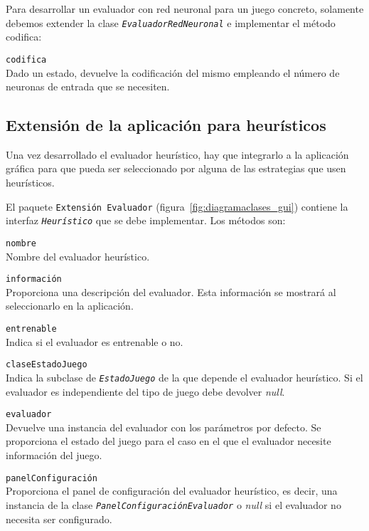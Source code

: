 \bigskip
Para desarrollar un evaluador con red neuronal para un juego concreto, solamente debemos extender la clase \texttt{\textit{EvaluadorRedNeuronal}} e implementar el método codifica:
\begin{description}
	\item \texttt{codifica} \\
	Dado un estado, devuelve la codificación del mismo empleando el número de neuronas de entrada que se necesiten.
\end{description}

\subsection{Extensión de la aplicación para heurísticos}
\label{ssec:extension_aplicacion_heuristicos}
Una vez desarrollado el evaluador heurístico, hay que integrarlo a la aplicación gráfica para que pueda ser seleccionado por alguna de las estrategias que usen heurísticos.

El paquete \texttt{Extensión Evaluador} (figura~\ref{fig:diagramaclases_gui}) contiene la interfaz \texttt{\textit{Heurístico}} que se debe implementar.
Los métodos son:
\begin{description}
\item \texttt{nombre} \\
	Nombre del evaluador heurístico.
	\item \texttt{información} \\
	Proporciona una descripción del evaluador. Esta información se mostrará al seleccionarlo en la aplicación.
	\item \texttt{entrenable} \\
	Indica si el evaluador es entrenable o no.
	\item \texttt{claseEstadoJuego} \\
	Indica la subclase de \texttt{\textit{EstadoJuego}} de la que depende el evaluador heurístico. Si el evaluador es independiente del tipo de juego debe devolver \textit{null}.	
	\item \texttt{evaluador} \\
	Devuelve una instancia del evaluador con los parámetros por defecto. Se proporciona el estado del juego para el caso en el que el evaluador necesite información del juego.
	\item \texttt{panelConfiguración} \\
	Proporciona el panel de configuración del evaluador heurístico, es decir, una instancia de la clase \texttt{\textit{PanelConfiguraciónEvaluador}} o \textit{null} si el evaluador no necesita ser configurado.
\end{description}


